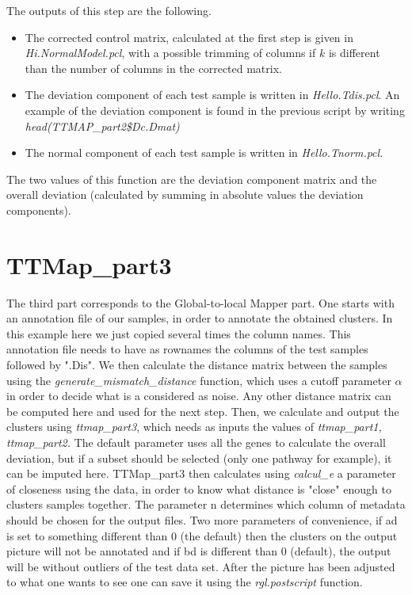 \documentclass[a4paper,12pt]{article}
\begin{document}
The outputs of this step are the following. 
\begin{itemize}
\item The corrected control matrix, calculated at the first step is given in \textit{Hi.NormalModel.pcl}, with a possible trimming of columns if $k$ is different than the number of columns in the corrected matrix.
\item The deviation component of each test sample is written in \textit{Hello.Tdis.pcl}. An example of the deviation component is found in the previous script by writing \textit{head(TTMAP\_part2\$Dc.Dmat)}
\item The normal component of each test sample is written in \textit{Hello.Tnorm.pcl}.
\end{itemize}
The two values of this function are the deviation component matrix and the overall deviation (calculated by summing in absolute values the deviation components).
\section{TTMap\_part3}

The third part corresponds to the Global-to-local Mapper part. One starts with an annotation file of our samples, in order to annotate the obtained clusters. In this example here we just copied several times the column names. This annotation file needs to have as rownames the columns of the test samples followed by ".Dis". We then calculate the distance matrix between the samples using the \textit{generate\_mismatch\_distance} function, which uses a cutoff parameter $\alpha$ in order to decide what is a considered as noise. Any other distance matrix can be computed here and used for the next step. Then, we calculate and output the clusters using \textit{ttmap\_part3}, which needs as inputs the values of \textit{ttmap\_part1, ttmap\_part2.} The default parameter uses all the genes to calculate the overall deviation, but if a subset should be selected (only one pathway for example), it can be imputed here. TTMap\_part3 then calculates using \textit{calcul\_e} a parameter of closeness using the data, in order to know what distance is "close" enough to clusters samples together. The parameter n determines which column of metadata should be chosen for the output files.  Two more parameters of convenience, if ad is set to something different than 0 (the default) then the clusters on the output picture will not be annotated and if bd is different than 0 (default), the output will be without outliers of the test data set. After the picture has been adjusted to what one wants to see one can save it using the \textit{rgl.postscript} function.
\end{document}
